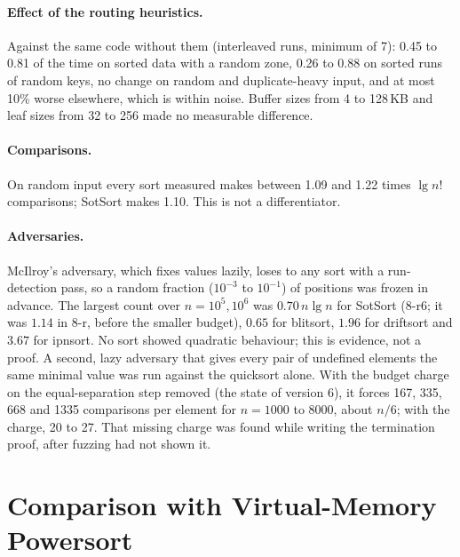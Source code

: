 \documentclass[10pt,a4paper]{article}
\begin{document}
\paragraph{Effect of the routing heuristics.} Against the same code without them
(interleaved runs, minimum of 7): 0.45 to 0.81 of the time on sorted data with a random
zone, 0.26 to 0.88 on sorted runs of random keys, no change on random and
duplicate-heavy input, and at most 10\% worse elsewhere, which is within noise. Buffer
sizes from 4 to 128\,KB and leaf sizes from 32 to 256 made no measurable difference.

\paragraph{Comparisons.} On random input every sort measured makes between 1.09 and 1.22 times
$\lg n!$ comparisons; SotSort makes 1.10. This is not a differentiator.

\paragraph{Adversaries.} McIlroy's adversary, which fixes values lazily, loses to any sort with
a run-detection pass, so a random fraction ($10^{-3}$ to $10^{-1}$) of positions was frozen in
advance. The largest count over $n=10^5,10^6$ was $0.70\,n\lg n$ for SotSort (8-r6; it was
$1.14$ in 8-r, before the smaller budget), $0.65$ for
blitsort, $1.96$ for driftsort and $3.67$ for ipnsort. No sort showed quadratic behaviour; this
is evidence, not a proof. A second, lazy adversary that gives every pair of undefined elements
the same minimal value was run against the quicksort alone. With the budget charge on the
equal-separation step removed (the state of version 6), it forces 167, 335, 668 and 1335
comparisons per element for $n=1000$ to $8000$, about $n/6$; with the charge, 20 to 27. That
missing charge was found while writing the termination proof, after fuzzing had not shown it.

\section{Comparison with Virtual-Memory Powersort}\label{sec:vmps}
\end{document}
